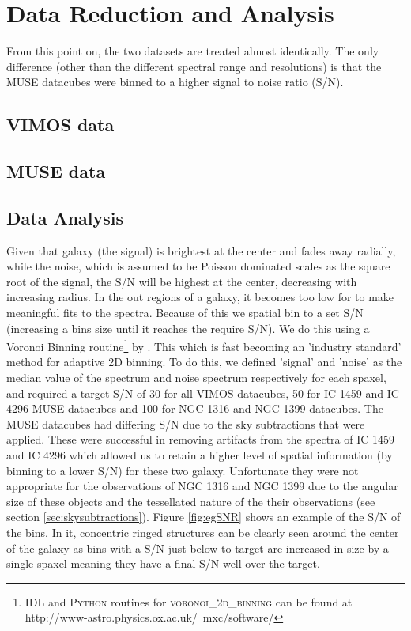 \chapter{Data Reduction and Analysis}
	\label{cha:Data}

From this point on, the two datasets are treated almost identically. The only difference (other than the different spectral range and resolutions) is that the MUSE datacubes were binned to a higher signal to noise ratio (S/N).

\section{VIMOS data}
	\label{sec:VIMOS}

\section{MUSE data}
	\label{sec:MUSE}


\section{Data Analysis}
	\label{sec:analysis}
	Given that galaxy (the signal) is brightest at the center and fades away radially, while the noise, which is assumed to be Poisson dominated scales as the square root of the signal, the S/N will be highest at the center, decreasing with increasing radius. In the out regions of a galaxy, it becomes too low for to make meaningful fits to the spectra. Because of this we spatial bin to a set S/N (increasing a bins size until it reaches the require S/N). We do this using a Voronoi Binning routine\footnote{\textsc{IDL} and \textsc{Python} routines for \textsc{voronoi\_2d\_binning} can be found at http://www-astro.physics.ox.ac.uk/~mxc/software/} by \citet{Cappellari2003}. This  which is fast becoming an 'industry standard' method for adaptive 2D binning. To do this, we defined 'signal' and 'noise' as the median value of the spectrum and noise spectrum respectively for each spaxel, and required a target S/N of 30 for all VIMOS datacubes, 50 for IC 1459 and IC 4296 MUSE datacubes and 100 for NGC 1316 and NGC 1399 datacubes. The MUSE datacubes had differing S/N due to the sky subtractions that were applied. These were successful in removing artifacts from the spectra of IC 1459 and IC 4296 which allowed us to retain a higher level of spatial information (by binning to a lower S/N) for these two galaxy. Unfortunate they were not appropriate for the observations of NGC 1316 and NGC 1399 due to the angular size of these objects and the tessellated nature of the their observations (see section \ref{sec:skysubtractions}). Figure \ref{fig:egSNR} shows an example of the S/N of the bins. In it, concentric ringed structures can be clearly seen around the center of the galaxy as bins with a S/N just below to target are increased in size by a single spaxel meaning they have a final S/N well over the target.

